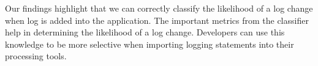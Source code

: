 Our findings highlight that we can correctly classify the likelihood of a log change when log is added into the application. The important metrics from the classifier help in determining the likelihood of a log change. Developers can use this knowledge to be more selective when importing logging statements into their processing tools. 




